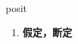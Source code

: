 
\begin{frame}
{\huge posit}
\begin{center}
\begin{enumerate}\Large
  \item \textbf{假定，断定}
\end{enumerate}
\end{center}
\end{frame}
